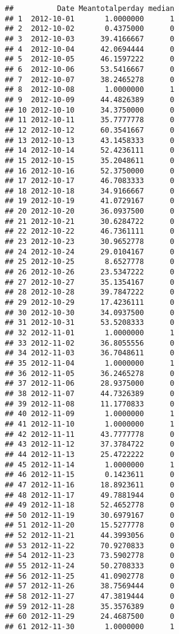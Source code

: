 \documentclass[]{article}
\begin{document}
\begin{verbatim}
##          Date Meantotalperday median
## 1  2012-10-01       1.0000000      1
## 2  2012-10-02       0.4375000      0
## 3  2012-10-03      39.4166667      0
## 4  2012-10-04      42.0694444      0
## 5  2012-10-05      46.1597222      0
## 6  2012-10-06      53.5416667      0
## 7  2012-10-07      38.2465278      0
## 8  2012-10-08       1.0000000      1
## 9  2012-10-09      44.4826389      0
## 10 2012-10-10      34.3750000      0
## 11 2012-10-11      35.7777778      0
## 12 2012-10-12      60.3541667      0
## 13 2012-10-13      43.1458333      0
## 14 2012-10-14      52.4236111      0
## 15 2012-10-15      35.2048611      0
## 16 2012-10-16      52.3750000      0
## 17 2012-10-17      46.7083333      0
## 18 2012-10-18      34.9166667      0
## 19 2012-10-19      41.0729167      0
## 20 2012-10-20      36.0937500      0
## 21 2012-10-21      30.6284722      0
## 22 2012-10-22      46.7361111      0
## 23 2012-10-23      30.9652778      0
## 24 2012-10-24      29.0104167      0
## 25 2012-10-25       8.6527778      0
## 26 2012-10-26      23.5347222      0
## 27 2012-10-27      35.1354167      0
## 28 2012-10-28      39.7847222      0
## 29 2012-10-29      17.4236111      0
## 30 2012-10-30      34.0937500      0
## 31 2012-10-31      53.5208333      0
## 32 2012-11-01       1.0000000      1
## 33 2012-11-02      36.8055556      0
## 34 2012-11-03      36.7048611      0
## 35 2012-11-04       1.0000000      1
## 36 2012-11-05      36.2465278      0
## 37 2012-11-06      28.9375000      0
## 38 2012-11-07      44.7326389      0
## 39 2012-11-08      11.1770833      0
## 40 2012-11-09       1.0000000      1
## 41 2012-11-10       1.0000000      1
## 42 2012-11-11      43.7777778      0
## 43 2012-11-12      37.3784722      0
## 44 2012-11-13      25.4722222      0
## 45 2012-11-14       1.0000000      1
## 46 2012-11-15       0.1423611      0
## 47 2012-11-16      18.8923611      0
## 48 2012-11-17      49.7881944      0
## 49 2012-11-18      52.4652778      0
## 50 2012-11-19      30.6979167      0
## 51 2012-11-20      15.5277778      0
## 52 2012-11-21      44.3993056      0
## 53 2012-11-22      70.9270833      0
## 54 2012-11-23      73.5902778      0
## 55 2012-11-24      50.2708333      0
## 56 2012-11-25      41.0902778      0
## 57 2012-11-26      38.7569444      0
## 58 2012-11-27      47.3819444      0
## 59 2012-11-28      35.3576389      0
## 60 2012-11-29      24.4687500      0
## 61 2012-11-30       1.0000000      1
\end{verbatim}
\end{document}
